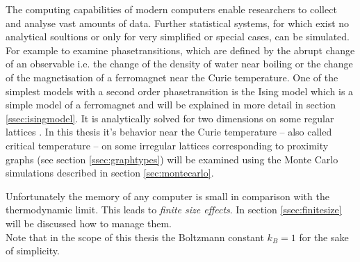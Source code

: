 The computing capabilities of modern computers enable researchers to
collect and analyse vast amounts of data.
Further statistical systems, for which exist no analytical soultions
or only for very simplified or special cases, can be simulated.
For example to examine phasetransitions, which are defined by the abrupt
change of an observable i.e. the change of the density of water near
boiling or the change of the magnetisation of a ferromagnet near the
Curie temperature. One of the simplest models with a second order
phasetransition is the Ising model \cite{Ising1925} which is a simple
model of a ferromagnet and will be explained in more detail in section
\ref{ssec:isingmodel}. It is analytically solved for two dimensions on
some regular lattices \cite{Onsager1944} \cite{Wannier1945}.
In this thesis it's behavior near the Curie temperature -- also called
critical temperature -- on some irregular lattices corresponding to
proximity graphs (see section \ref{ssec:graphtypes}) will be examined
using the Monte Carlo simulations described in section \ref{sec:montecarlo}.

Unfortunately the memory of any computer is small in comparison with the
thermodynamic limit. This leads to \emph{finite size effects}.
In section \ref{ssec:finitesize} will be discussed how to manage them.\\

Note that in the scope of this thesis the Boltzmann constant \(k_{B}=1\)
for the sake of simplicity.
